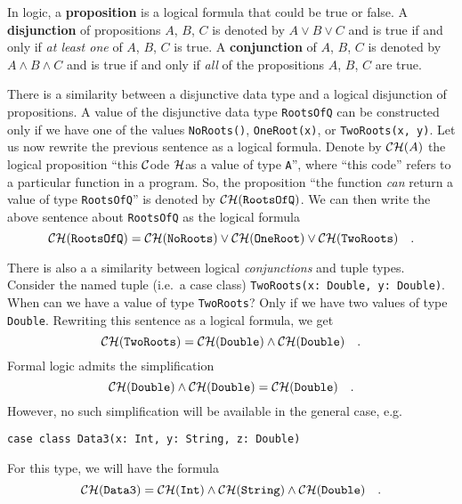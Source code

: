 In logic, a \textbf{proposition} is
a logical formula that could be true or false. A \textbf{disjunction}
of propositions $A$, $B$, $C$ is denoted by $A\vee B\vee C$ and
is true if and only if \emph{at least one} of $A$, $B$, $C$ is
true. A \textbf{conjunction} of $A$,
$B$, $C$ is denoted by $A\wedge B\wedge C$ and is true if and only
if \emph{all} of the propositions $A$, $B$, $C$ are true.

There is a similarity between a disjunctive data type and a logical
disjunction of propositions. A value of the disjunctive data type
\lstinline!RootsOfQ! can be constructed only if we have one of the
values \lstinline!NoRoots()!, \lstinline!OneRoot(x)!, or \lstinline!TwoRoots(x, y)!.
Let us now rewrite the previous sentence as a logical formula. Denote
by ${\cal CH}(A)$ the logical proposition \textsf{``}this ${\cal C}$ode
${\cal H}$as a value of type \lstinline!A!\textsf{''}, where \textsf{``}this code\textsf{''}
refers to a particular function in a program. So, the proposition
\textsf{``}the function \emph{can} return a value of type \lstinline!RootsOfQ!\textsf{''}
is denoted by ${\cal CH}(\text{\texttt{RootsOfQ}})$. We can then
write the above sentence about \lstinline!RootsOfQ! as the logical
formula
\begin{equation}
{\cal CH}(\text{\texttt{RootsOfQ}})={\cal CH}(\text{\texttt{NoRoots}})\vee{\cal CH}(\text{\texttt{OneRoot}})\vee{\cal CH}(\text{\texttt{TwoRoots}})\quad.\label{eq:curry-howard-example-disjunction}
\end{equation}

There is also a a similarity between logical \emph{conjunctions} and
tuple types. Consider the named tuple (i.e.~a case class) \lstinline!TwoRoots(x: Double, y: Double)!.
When can we have a value of type \lstinline!TwoRoots!? Only if we
have two values of type \lstinline!Double!. Rewriting this sentence
as a logical formula, we get
\[
{\cal CH}(\text{\texttt{TwoRoots}})={\cal CH}(\text{\texttt{Double}})\wedge{\cal CH}(\text{\texttt{Double}})\quad.
\]
Formal logic admits the simplification
\[
{\cal CH}(\text{\texttt{Double}})\wedge{\cal CH}(\text{\texttt{Double}})={\cal CH}(\text{\texttt{Double}})\quad.
\]
However, no such simplification will be available in the general case,
e.g.
\begin{lstlisting}
case class Data3(x: Int, y: String, z: Double)
\end{lstlisting}
For this type, we will have the formula 
\begin{equation}
{\cal CH}(\text{\texttt{Data3}})={\cal CH}(\text{\texttt{Int}})\wedge{\cal CH}(\text{\texttt{String}})\wedge{\cal CH}(\text{\texttt{Double}})\quad.\label{eq:curry-howard-example-case-class}
\end{equation}

